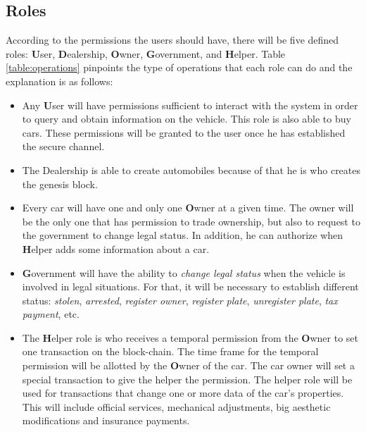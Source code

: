 \subsection{Roles}

According to the permissions the users should have, there will be five defined roles: 
\textbf{U}ser,
\textbf{D}ealership,
\textbf{O}wner,
\textbf{G}overnment, and
\textbf{H}elper.
Table \ref{table:operations} pinpoints the type of operations that each role can do and the explanation
is as follows: 
\begin{itemize}
    \item Any \textbf{U}ser will have permissions sufficient to interact with the system in order to 
        query and obtain information on the     vehicle. This role is also able to buy cars. 
        These permissions will be granted to the user once he has established the secure channel. 
    \item The {D}ealership is able to create automobiles because of that he is who creates the 
        genesis block.
    \item Every car will have one and only one \textbf{O}wner at a given time. The owner will be the only one 
        that has permission to trade ownership, but also to request to the government to change legal
        status. In addition, he can authorize when \textbf{H}elper adds some information about a car.
    \item \textbf{G}overnment will have the ability to  \textit{change legal status} when the 
        vehicle is involved in legal situations. For that, it will be necessary to establish 
        different status: \textit{stolen}, \textit{arrested}, \textit{register owner}, \textit{register plate}, 
        \textit{unregister plate}, \textit{tax payment}, etc.
    \item The \textbf{H}elper role is who receives a temporal permission from the \textbf{O}wner to set one 
        transaction on the block-chain. The time frame for the temporal permission will be allotted by 
        the \textbf{O}wner of the car. The car owner will set a special transaction to give the helper 
        the permission. The helper role will be used for transactions that change one or more data of the 
        car's properties. This will include official services, mechanical adjustments, big aesthetic 
        modifications and insurance payments.
\end{itemize}







